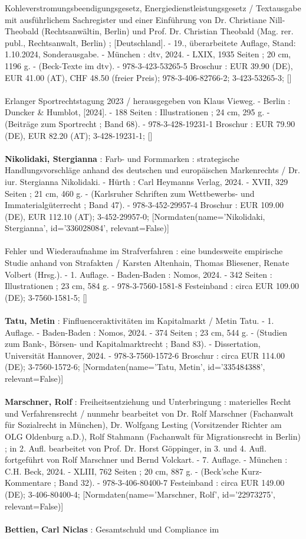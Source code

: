 \documentclass{article}
\begin{document}
\begin{multicols}{3}
Kohleverstromungsbeendigungsgesetz, Energiedienstleistungsgesetz / Textausgabe mit ausführlichem Sachregister und einer Einführung von Dr. Christiane Nill-Theobald (Rechtsanwältin, Berlin) und Prof. Dr. Christian Theobald (Mag. rer. publ., Rechtsanwalt, Berlin) ; [Deutschland]. - 19., überarbeitete Auflage, Stand: 1.10.2024, Sonderausgabe. - München : dtv, 2024. - LXIX, 1935 Seiten ; 20 cm, 1196 g. - (Beck-Texte im dtv). - 978-3-423-53265-5 Broschur : EUR 39.90 (DE), EUR 41.00 (AT), CHF 48.50 (freier Preis); 978-3-406-82766-2; 3-423-53265-3; []\\\\Erlanger Sportrechtstagung 2023 / herausgegeben von Klaus Vieweg. - Berlin : Duncker \& Humblot, [2024]. - 188 Seiten : Illustrationen ; 24 cm, 295 g. - (Beiträge zum Sportrecht ; Band 68). - 978-3-428-19231-1 Broschur : EUR 79.90 (DE), EUR 82.20 (AT); 3-428-19231-1; []\\\\\textbf{Nikolidaki, Stergianna} : Farb- und Formmarken : strategische Handlungsvorschläge anhand des deutschen und europäischen Markenrechts / Dr. iur. Stergianna Nikolidaki. - Hürth : Carl Heymanns Verlag, 2024. - XVII, 329 Seiten ; 21 cm, 460 g. - (Karlsruher Schriften zum Wettbewerbs- und Immaterialgüterrecht ; Band 47). - 978-3-452-29957-4 Broschur : EUR 109.00 (DE), EUR 112.10 (AT); 3-452-29957-0; [Normdaten(name='Nikolidaki, Stergianna', id='336028084', relevant=False)]\\\\Fehler und Wiederaufnahme im Strafverfahren : eine bundesweite empirische Studie anhand von Strafakten / Karsten Altenhain, Thomas Bliesener, Renate  Volbert (Hrsg.). - 1. Auflage. - Baden-Baden : Nomos, 2024. - 342 Seiten : Illustrationen ; 23 cm, 584 g. - 978-3-7560-1581-8 Festeinband : circa EUR 109.00 (DE); 3-7560-1581-5; []\\\\\textbf{Tatu, Metin} : Finfluenceraktivitäten im Kapitalmarkt / Metin Tatu. - 1. Auflage. - Baden-Baden : Nomos, 2024. - 374 Seiten ; 23 cm, 544 g. - (Studien zum Bank-, Börsen- und Kapitalmarktrecht ; Band 83). - Dissertation, Universität Hannover, 2024. - 978-3-7560-1572-6 Broschur : circa EUR 114.00 (DE); 3-7560-1572-6; [Normdaten(name='Tatu, Metin', id='335484388', relevant=False)]\\\\\textbf{Marschner, Rolf} : Freiheitsentziehung und Unterbringung : materielles Recht und Verfahrensrecht / nunmehr bearbeitet von Dr. Rolf Marschner (Fachanwalt für Sozialrecht in München), Dr. Wolfgang Lesting (Vorsitzender Richter am OLG Oldenburg a.D.), Rolf Stahmann (Fachanwalt für Migrationsrecht in Berlin) ; in 2. Aufl. bearbeitet von Prof. Dr. Horst Göppinger, in 3. und 4. Aufl. fortgeführt von Rolf Marschner und Bernd Volckart. - 7. Auflage. - München : C.H. Beck, 2024. - XLIII, 762 Seiten ; 20 cm, 887 g. - (Beck'sche Kurz-Kommentare ; Band 32). - 978-3-406-80400-7 Festeinband : circa EUR 149.00 (DE); 3-406-80400-4; [Normdaten(name='Marschner, Rolf', id='22973275', relevant=False)]\\\\\textbf{Bettien, Carl Niclas} : Gesamtschuld und Compliance im 
\end{multicols}
\end{document}
